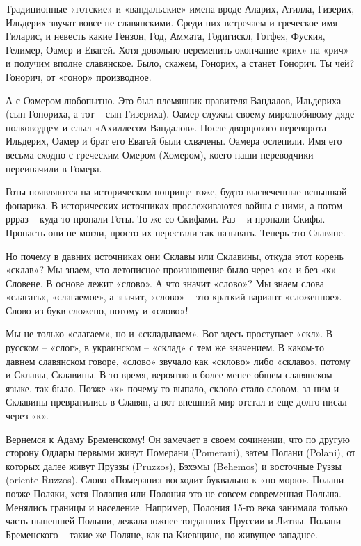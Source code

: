 Традиционные «готские» и «вандальские» имена вроде Аларих, Атилла, Гизерих, Ильдерих звучат вовсе не славянскими. Среди них встречаем и греческое имя Гиларис, и невесть какие Гензон, Год, Аммата, Годигискл, Готфея, Фуския, Гелимер, Оамер и Евагей. Хотя довольно переменить окончание «рих» на «рич» и получим вполне славянское. Было, скажем, Гонорих, а станет Гонорич. Ты чей? Гонорич, от «гонор» производное.

А с Оамером любопытно. Это был племянник правителя Вандалов, Ильдериха (сын Гонориха, а тот – сын Гизериха). Оамер служил своему миролюбивому дяде полководцем и слыл «Ахиллесом Вандалов». После дворцового переворота Ильдерих, Оамер и брат его Евагей были схвачены. Оамера ослепили. Имя его весьма сходно с греческим Омером (Хомером), коего наши переводчики переиначили в Гомера.

Готы появляются на историческом поприще тоже, будто высвеченные вспышкой фонарика. В исторических источниках прослеживаются войны с ними, а потом ррраз – куда-то пропали Готы. То же со Скифами. Раз – и пропали Скифы. Пропасть они не могли, просто их перестали так называть. Теперь это Славяне.
 
Но почему в давних источниках они Склавы или Склавины, откуда этот корень «склав»? Мы знаем, что летописное произношение было через «о» и без «к» – Словене. В основе лежит «слово». А что значит «слово»? Мы знаем слова «слагать», «слагаемое», а значит, «слово» – это краткий вариант «сложенное». Слово из букв сложено, потому и «слово»!

Мы не только «слагаем», но и «складываем». Вот здесь проступает «скл». В русском – «слог», в украинском – «склад» с тем же значением. В каком-то давнем славянском говоре, «слово» звучало как «склово» либо «склаво», потому и Склавы, Склавины. В то время, вероятно в более-менее общем славянском языке, так было. Позже «к» почему-то выпало, склово стало словом, за ним и Склавины превратились в Славян, а вот внешний мир отстал и еще долго писал через «к».

Вернемся к Адаму Бременскому! Он замечает в своем сочинении, что по другую сторону Оддары первыми живут Померани (Pomerani), затем Полани (Polani), от которых далее живут Пруззы (Pruzzos), Бэхэмы (Behemos) и восточные Руззы (oriente Ruzzos). Слово «Померани» восходит буквально к «по морю». Полани – позже Поляки, хотя Полания или Полония это не совсем современная Польша. Менялись границы и население. Например, Полония 15-го века занимала только часть нынешней Польши, лежала южнее тогдашних Пруссии и Литвы. Полани Бременского – такие же Поляне, как на Киевщине, но живущее западнее.

